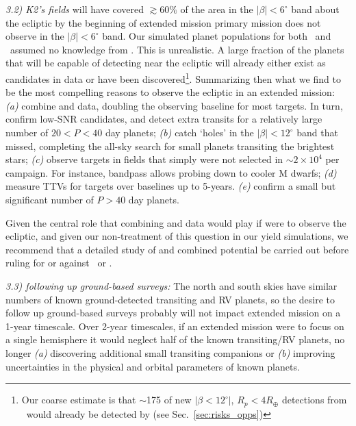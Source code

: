 \textit{3.2) K2's fields} will have covered $\gtrsim\!60\%$ of the area in the $|\beta|<6^\circ$ band about the ecliptic by the beginning of \tesss extended mission %
\tesss primary mission does not observe in the $|\beta|<6^\circ$ band. 
Our simulated planet populations for both \elong\ and \eshort\ assumed no knowledge from \ktwo\!.
This is unrealistic.
A large fraction of the planets that \tess will be capable of detecting near the ecliptic will already either exist as candidates in \ktwos data or have been discovered\footnote{Our coarse estimate is that $\sim$175 of  new $|\beta<12^\circ|$, $R_p<4R_\oplus$ detections from \elong\ would already be detected by \ktwo (see Sec.~\protect\ref{sec:risks_opps})}.
Summarizing then what we find to be the most compelling reasons to observe the ecliptic in an extended \tess mission:
\textit{(a)} combine \tess and \ktwo data, doubling the \ktwo observing baseline for most targets. In turn, confirm low-SNR candidates, and detect extra transits for a relatively large number of $20<P<40$ day planets;
\textit{(b)} catch `holes' in the $|\beta| < 12^\circ$ band that \ktwo missed, completing the all-sky search for small planets transiting the brightest stars;
\textit{(c)} observe targets in \ktwo fields that simply were not selected in \ktwos $\sim\!2\times10^4$ per campaign. For instance, \tesss bandpass allows probing down to cooler M dwarfs;
\textit{(d)} measure TTVs for targets over baselines up to 5-years.
\textit{(e)} confirm a small but significant number of $P>40$ day planets.

Given the central role that combining \tess and \ktwo data would play if \tess were to observe the ecliptic, and given our non-treatment of this question in our yield simulations, we recommend that a detailed study of \ktwo and \tesss combined potential be carried out before ruling for or against \elong\ or \eshort.

\textit{3.3) \tess following up ground-based surveys:}
The north and south skies have similar numbers of known ground-detected transiting and RV planets, so the desire to follow up ground-based surveys probably will not impact \tesss extended mission on a 1-year timescale.
Over 2-year timescales, if an extended mission were to focus on a single hemisphere it would neglect half of the known transiting/RV planets, no longer \textit{(a)} discovering additional small transiting companions %
or \textit{(b)} improving uncertainties in the physical and orbital parameters of known planets.


